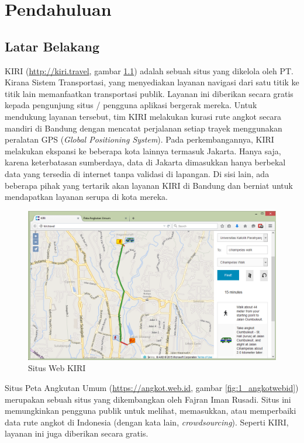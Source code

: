 \chapter{Pendahuluan}

\section{Latar Belakang}

KIRI (\url{http://kiri.travel}, gambar \ref{fig:1_kiri}) adalah sebuah situs yang dikelola oleh PT. Kirana Sistem Transportasi, yang menyediakan layanan navigasi dari satu titik ke titik lain memanfaatkan transportasi publik. Layanan ini diberikan secara gratis kepada pengunjung situs / pengguna aplikasi bergerak mereka. Untuk mendukung layanan tersebut, tim KIRI melakukan kurasi rute angkot secara mandiri di Bandung dengan mencatat perjalanan setiap trayek menggunakan peralatan GPS (\textit{Global Positioning System}). Pada perkembangannya, KIRI melakukan ekspansi ke beberapa kota lainnya termasuk Jakarta. Hanya saja, karena keterbatasan sumberdaya, data di Jakarta dimasukkan hanya berbekal data yang tersedia di internet tanpa validasi di lapangan. Di sisi lain, ada beberapa pihak yang tertarik akan layanan KIRI di Bandung dan berniat untuk mendapatkan layanan serupa di kota mereka.

\begin{figure}
	\centering
	\includegraphics[scale=0.5]{Gambar/1_kiri}
	\caption{Situs Web KIRI} 
	\label{fig:1_kiri}
\end{figure}

Situs Peta Angkutan Umum (\url{https://angkot.web.id}, gambar \ref{fig:1_angkotwebid}) merupakan sebuah situs yang dikembangkan oleh Fajran Iman Rusadi. Situs ini memungkinkan pengguna publik untuk melihat, memasukkan, atau memperbaiki data rute angkot di Indonesia (dengan kata lain, \textit{crowdsourcing}). Seperti KIRI, layanan ini juga diberikan secara gratis.

